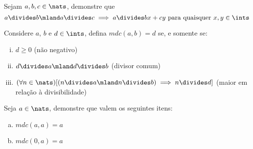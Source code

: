 \begin{exercise}
%
	Sejam $a,b,c \in \nats$, demonstre que
	$$a \divides b \mland a \divides c \implies a \divides bx + cy \text{ para quaisquer } x,y \in \ints$$
\end{exercise}

\begin{definition}
%
	Considere $a$, $b$ e $d\in \ints$, defina $mdc(a,b) = d$ se, e somente se:
	\begin{enumerate}[(i)]
		\item $d \geq 0$ (não negativo)
		\item $d \divides a \mland d \divides b$ (divisor comum)
		\item $(\forall n \in \nats)[ (n \divides a \mland n \divides b) \implies n \divides d ]$ (maior em relação à divisibilidade)
	\end{enumerate}
\end{definition}

\begin{exercise}
%
	Seja $a \in \nats$, demonstre que valem os seguintes itens:
	\begin{enumerate}[(a)]
		\item $mdc(a,a) = a$
		\item $mdc(0,a) = a$
	\end{enumerate}
\end{exercise}
